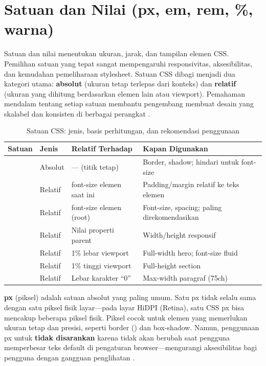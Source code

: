 ﻿\section{Satuan dan Nilai (px, em, rem, \%, warna)}

Satuan dan nilai menentukan ukuran, jarak, dan tampilan elemen CSS. Pemilihan satuan yang tepat sangat mempengaruhi responsivitas, aksesibilitas, dan kemudahan pemeliharaan stylesheet. Satuan CSS dibagi menjadi dua kategori utama: \textbf{absolut} (ukuran tetap terlepas dari konteks) dan \textbf{relatif} (ukuran yang dihitung berdasarkan elemen lain atau viewport). Pemahaman mendalam tentang setiap satuan membantu pengembang membuat desain yang skalabel dan konsisten di berbagai perangkat \cite{mdnCss}.

\begin{table}[H]
\centering
\begin{tabular}{|P{1.5cm}|P{1.5cm}|P{3.5cm}|P{5cm}|}
\hline
\textbf{Satuan} & \textbf{Jenis} & \textbf{Relatif Terhadap} & \textbf{Kapan Digunakan} \\
\hline
{} & Absolut & --- (titik tetap) & Border, shadow; hindari untuk font-size \\
\hline
{} & Relatif & font-size elemen saat ini & Padding/margin relatif ke teks elemen \\
\hline
{} & Relatif & font-size elemen  (root) & Font-size, spacing; paling direkomendasikan \\
\hline
\code{\%} & Relatif & Nilai properti parent & Width/height responsif \\
\hline
{} & Relatif & 1\% lebar viewport & Full-width hero; font-size fluid \\
\hline
{} & Relatif & 1\% tinggi viewport & Full-height section \\
\hline
{} & Relatif & Lebar karakter ``0'' & Max-width paragraf (75ch) \\
\hline
\end{tabular}
\caption{Satuan CSS: jenis, basis perhitungan, dan rekomendasi penggunaan}
\end{table}

\textbf{px} (piksel) adalah satuan absolut yang paling umum. Satu px tidak selalu sama dengan satu piksel fisik layar---pada layar HiDPI (Retina), satu CSS px bisa mencakup beberapa piksel fisik. Piksel cocok untuk elemen yang memerlukan ukuran tetap dan presisi, seperti border () dan box-shadow. Namun, penggunaan px untuk  \textbf{tidak disarankan} karena tidak akan berubah saat pengguna memperbesar teks default di pengaturan browser---mengurangi aksesibilitas bagi pengguna dengan gangguan penglihatan \cite{webdevCss}.


